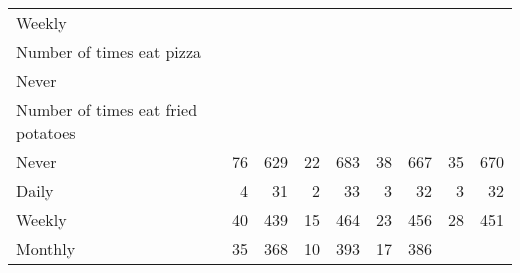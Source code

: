 \documentclass{article}
\begin{document}
\begin{tabular}{lllllllll}
\multicolumn{1}{l}{\hspace{1em}Weekly} &
  \multicolumn{1}{|r}{} &
  \multicolumn{1}{r}{} &
  \multicolumn{1}{r}{} &
  \multicolumn{1}{r}{} &
  \multicolumn{1}{r}{} &
  \multicolumn{1}{r}{} &
  \multicolumn{1}{r}{} &
  \multicolumn{1}{r}{} \\
\multicolumn{1}{l}{\hspace{2em}Number of times eat pizza} &
  \multicolumn{1}{|r}{} &
  \multicolumn{1}{r}{} &
  \multicolumn{1}{r}{} &
  \multicolumn{1}{r}{} &
  \multicolumn{1}{r}{} &
  \multicolumn{1}{r}{} &
  \multicolumn{1}{r}{} &
  \multicolumn{1}{r}{} \\
\multicolumn{1}{l}{\hspace{3em}Never} &
  \multicolumn{1}{|r}{} &
  \multicolumn{1}{r}{} &
  \multicolumn{1}{r}{} &
  \multicolumn{1}{r}{} &
  \multicolumn{1}{r}{} &
  \multicolumn{1}{r}{} &
  \multicolumn{1}{r}{} &
  \multicolumn{1}{r}{} \\
\multicolumn{1}{l}{\hspace{4em}Number of times eat fried potatoes} &
  \multicolumn{1}{|r}{} &
  \multicolumn{1}{r}{} &
  \multicolumn{1}{r}{} &
  \multicolumn{1}{r}{} &
  \multicolumn{1}{r}{} &
  \multicolumn{1}{r}{} &
  \multicolumn{1}{r}{} &
  \multicolumn{1}{r}{} \\
\multicolumn{1}{l}{\hspace{5em}Never} &
  \multicolumn{1}{|r}{76} &
  \multicolumn{1}{r}{629} &
  \multicolumn{1}{r}{22} &
  \multicolumn{1}{r}{683} &
  \multicolumn{1}{r}{38} &
  \multicolumn{1}{r}{667} &
  \multicolumn{1}{r}{35} &
  \multicolumn{1}{r}{670} \\
\multicolumn{1}{l}{\hspace{5em}Daily} &
  \multicolumn{1}{|r}{4} &
  \multicolumn{1}{r}{31} &
  \multicolumn{1}{r}{2} &
  \multicolumn{1}{r}{33} &
  \multicolumn{1}{r}{3} &
  \multicolumn{1}{r}{32} &
  \multicolumn{1}{r}{3} &
  \multicolumn{1}{r}{32} \\
\multicolumn{1}{l}{\hspace{5em}Weekly} &
  \multicolumn{1}{|r}{40} &
  \multicolumn{1}{r}{439} &
  \multicolumn{1}{r}{15} &
  \multicolumn{1}{r}{464} &
  \multicolumn{1}{r}{23} &
  \multicolumn{1}{r}{456} &
  \multicolumn{1}{r}{28} &
  \multicolumn{1}{r}{451} \\
\multicolumn{1}{l}{\hspace{5em}Monthly} &
  \multicolumn{1}{|r}{35} &
  \multicolumn{1}{r}{368} &
  \multicolumn{1}{r}{10} &
  \multicolumn{1}{r}{393} &
  \multicolumn{1}{r}{17} &
  \multicolumn{1}{r}{386} &

\end{tabular}
\end{document}
